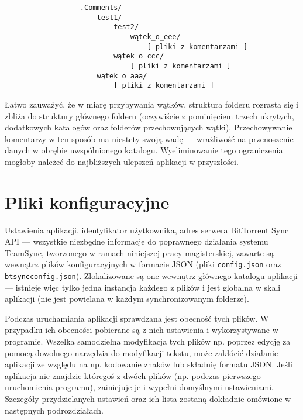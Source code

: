 \begin{minipage}{\linewidth}
\vspace{1em}
\begin{verbatim}
                  .Comments/
                      test1/
                          test2/
                              wątek_o_eee/
                                  [ pliki z komentarzami ]
                          wątek_o_ccc/
                              [ pliki z komentarzami ]
                      wątek_o_aaa/
                          [ pliki z komentarzami ]
\end{verbatim}
\vspace{1em}
\end{minipage}

Łatwo zauważyć, że w miarę przybywania wątków, struktura folderu rozrasta się i zbliża do struktury głównego folderu (oczywiście z pominięciem trzech ukrytych, dodatkowych katalogów oraz folderów przechowujących wątki). Przechowywanie komentarzy w ten sposób ma niestety swoją wadę --- wrażliwość na przenoszenie danych w obrębie uwspólnionego katalogu. Wyeliminowanie tego ograniczenia mogłoby należeć do najbliższych ulepszeń aplikacji w przyszłości.

\section{Pliki konfiguracyjne}

Ustawienia aplikacji, identyfikator użytkownika, adres serwera BitTorrent Sync API --- wszystkie niezbędne informacje do poprawnego działania systemu TeamSync, tworzonego w ramach niniejszej pracy magisterskiej, zawarte są wewnątrz plików konfiguracyjnych w formacie JSON (pliki \texttt{config.json} oraz \texttt{btsyncconfig.json}). Zlokalizowane są one wewnątrz głównego katalogu aplikacji --- istnieje więc tylko jedna instancja każdego z plików i jest globalna w skali aplikacji (nie jest powielana w każdym synchronizowanym folderze).

Podczas uruchamiania aplikacji sprawdzana jest obecność tych plików. W przypadku ich obecności pobierane są z nich ustawienia i wykorzystywane w programie. Wszelka samodzielna modyfikacja tych plików np. poprzez edycję za pomocą dowolnego narzędzia do modyfikacji tekstu, może zakłócić działanie aplikacji ze względu na np. kodowanie znaków lub składnię formatu JSON. Jeśli aplikacja nie znajdzie któregoś z dwóch plików (np. podczas pierwszego uruchomienia programu), zainicjuje je i wypełni domyślnymi ustawieniami. Szczegóły przydzielanych ustawień oraz ich lista zostaną dokładnie omówione w następnych podrozdziałach.

